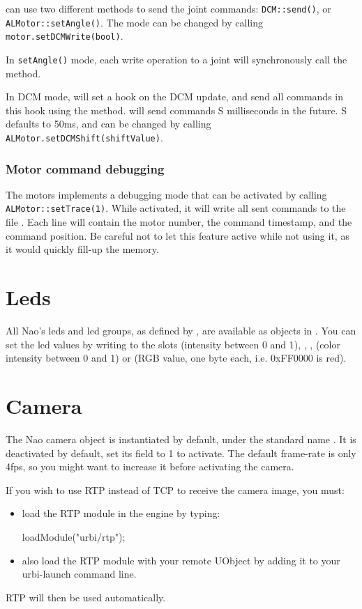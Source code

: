 \urbi can use two different methods to send the joint commands:
\lstinline|DCM::send()|, or \lstinline|ALMotor::setAngle()|.  The mode can
be changed by calling \lstinline|motor.setDCMWrite(bool)|.

In \lstinline|setAngle()| mode, each write operation to a joint will
synchronously call the  \naoqi method.

In DCM mode, \urbi will set a hook on the DCM update, and send all commands
in this hook using the  method.  \urbi will send commands S
milliseconds in the future. S defaults to 50ms, and can be changed by
calling \lstinline|ALMotor.setDCMShift(shiftValue)|.

\subsubsection{Motor command debugging}

The motors implements a debugging mode that can be activated by calling
\lstinline|ALMotor::setTrace(1)|. While activated, it will write all sent
commands to the file . Each line will contain the motor
number, the command timestamp, and the command position.  Be careful not to
let this feature active while not using it, as it would quickly fill-up the
memory.

\section{Leds}

All Nao's leds and led groups, as defined by \naoqi, are available as
objects in \us. You can set the led values by writing to the slots
 (intensity between 0 and 1), , , 
(color intensity between 0 and 1) or  (RGB value, one byte
each, i.e. 0xFF0000 is red).

\section{Camera}
The Nao camera object is instantiated by default, under the standard name
. It is deactivated by default, set its  field to 1 to
activate. The default frame-rate is only 4fps, so you might want to increase
it before activating the camera.

If you wish to use RTP instead of TCP to receive the camera image, you must:
\begin{itemize}
\item load the RTP module in the engine by typing:
\begin{urbiunchecked}
loadModule("urbi/rtp");
\end{urbiunchecked}
\item also load the RTP module with your remote UObject by adding it to your
urbi-launch command line.
\end{itemize}
RTP will then be used automatically.

